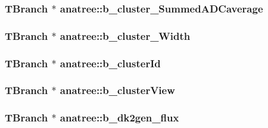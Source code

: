 \hypertarget{classanatree_ab7023e11831e39619f69edf88400a0a7}{
\subsubsection[{b\-\_\-cluster\-\_\-\-Summed\-A\-D\-Caverage}]{\setlength{\rightskip}{0pt plus 5cm}T\-Branch $\ast$ anatree\-::b\-\_\-cluster\-\_\-\-Summed\-A\-D\-Caverage}}\label{classanatree_ab7023e11831e39619f69edf88400a0a7}
\hypertarget{classanatree_a7a61097f1417a99882831d6bbe533b2a}{
\subsubsection[{b\-\_\-cluster\-\_\-\-Width}]{\setlength{\rightskip}{0pt plus 5cm}T\-Branch $\ast$ anatree\-::b\-\_\-cluster\-\_\-\-Width}}\label{classanatree_a7a61097f1417a99882831d6bbe533b2a}
\hypertarget{classanatree_ab8f7649098e53db2cae4786cd614215c}{
\subsubsection[{b\-\_\-cluster\-Id}]{\setlength{\rightskip}{0pt plus 5cm}T\-Branch $\ast$ anatree\-::b\-\_\-cluster\-Id}}\label{classanatree_ab8f7649098e53db2cae4786cd614215c}
\hypertarget{classanatree_a3dd99c1458502b95769e28e970ac4358}{
\subsubsection[{b\-\_\-cluster\-View}]{\setlength{\rightskip}{0pt plus 5cm}T\-Branch $\ast$ anatree\-::b\-\_\-cluster\-View}}\label{classanatree_a3dd99c1458502b95769e28e970ac4358}
\hypertarget{classanatree_a5469514a924ef658f47633d33036b1b7}{
\subsubsection[{b\-\_\-dk2gen\-\_\-flux}]{\setlength{\rightskip}{0pt plus 5cm}T\-Branch $\ast$ anatree\-::b\-\_\-dk2gen\-\_\-flux}}\label{classanatree_a5469514a924ef658f47633d33036b1b7}
